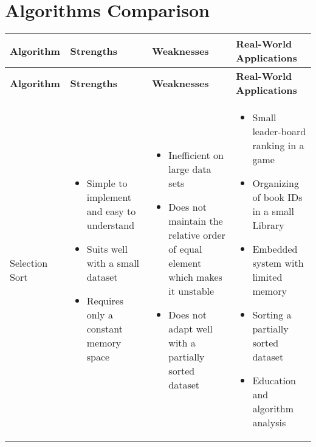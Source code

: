 \documentclass{article}
\begin{document}
\clearpage
\section{Algorithms Comparison}
\begin{longtable}{|p{2.5cm}|p{4.3cm}|p{4.3cm}|p{}|}
\hline
\textbf{Algorithm} & \textbf{Strengths} & \textbf{Weaknesses} & \textbf{Real-World \newline Applications} \\
\hline
\endfirsthead
\hline
\textbf{Algorithm} & \textbf{Strengths} & \textbf{Weaknesses} & \textbf{Real-World Applications} \\
\hline
\endhead

Selection Sort &
\begin{itemize}
\itemindent=-13pt
\item Simple to implement and easy to understand
\item Suits well with a small dataset 
\item Requires only a constant memory space 
\end{itemize}
&
\begin{itemize}
\itemindent=-13pt
\item Inefficient on large data sets 
\item Does not maintain the relative order of equal element which makes it unstable 
\item Does not adapt well with a partially sorted dataset 
\end{itemize}
&
\begin{itemize}
\itemindent=-13pt
\item Small leader-board ranking in a game
\item Organizing of book IDs in a small Library
\item Embedded system with limited memory 
\item Sorting a partially sorted dataset
\item Education and algorithm analysis
\end{itemize}
\\
\hline


\end{longtable}
\end{document}
